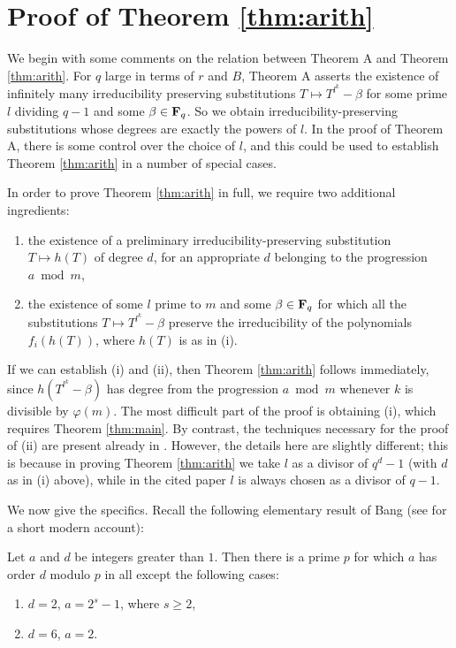 \documentclass[a4paper]{compositio}
\begin{document}
\section{Proof of Theorem \ref{thm:arith}}\label{sec:arithm} We begin with some comments on the relation
between Theorem A and Theorem \ref{thm:arith}. For $q$ large in
terms of $r$ and $B$, Theorem A asserts the existence of infinitely
many irreducibility preserving substitutions $T \mapsto
T^{l^k}-\beta$ for some prime $l$ dividing $q-1$ and some $\beta \in
\mathbf{F}_q$. So we obtain irreducibility-preserving substitutions whose
degrees are exactly the powers of $l$. In the proof of Theorem A,
there is some control over the choice of $l$, and this could be used
to establish Theorem \ref{thm:arith} in a number of special cases.

In order to prove Theorem \ref{thm:arith} in full, we require two
additional ingredients:
\begin{enumerate}
\item the existence of a preliminary irreducibility-preserving substitution $T \mapsto h(T)$
of degree $d$, for an appropriate $d$ belonging to the progression
$a\bmod m$,
\item the existence of some $l$ prime to $m$ and some $\beta \in \mathbf{F}_q$ for which all the
substitutions $T\mapsto T^{l^k}-\beta$ preserve the irreducibility
of the polynomials $f_i(h(T))$, where $h(T)$ is as in (i).
\end{enumerate}
If we can establish (i) and (ii), then Theorem \ref{thm:arith}
follows immediately, since $h(T^{l^k}-\beta)$ has degree from the
progression $a\bmod m$ whenever $k$ is divisible by $\varphi(m)$.
The most difficult part of the proof is obtaining (i), which
requires Theorem \ref{thm:main}. By contrast, the techniques
necessary for the proof of (ii) are present already in
\cite{pollack06a}. However, the details here are slightly different;
this is because in proving Theorem \ref{thm:arith} we take $l$ as a
divisor of $q^d-1$ (with $d$ as in (i) above), while in the cited
paper $l$ is always chosen as a divisor of $q-1$.

We now give the specifics. Recall the following elementary result of
Bang \cite{bang86} (see \cite[Theorem 3]{roitman97} for a short
modern account):
\begin{bang} Let $a$ and $d$ be integers greater than $1$. Then
there is a prime $p$ for which $a$ has order $d$ modulo $p$ in all
except the following cases:
\begin{enumerate}
\item $d=2$, $a=2^s-1$, where $s\geq 2$,
\item $d=6$, $a=2$.
\end{enumerate}
\end{bang}
\end{document}
